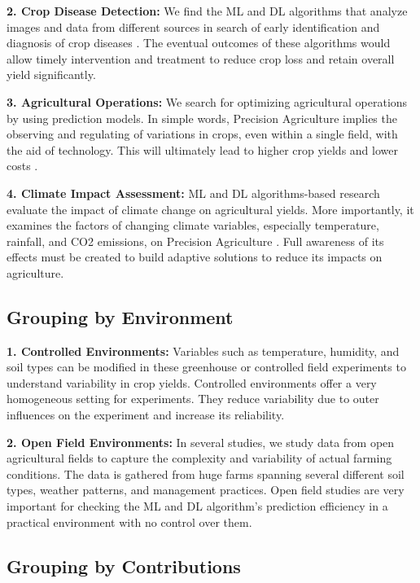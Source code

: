 \documentclass[conference]{IEEEtran}
\begin{document}
\textbf{2. Crop Disease Detection:}
We find the ML and DL algorithms that analyze images and data from different sources in search of early identification and diagnosis of crop diseases \cite{b71}. The eventual outcomes of these algorithms would allow timely intervention and treatment to reduce crop loss and retain overall yield significantly.

\textbf{3. Agricultural Operations:}
We search for optimizing agricultural operations by using prediction models. In simple words, Precision Agriculture implies the observing and regulating of variations in crops, even within a single field, with the aid of technology. This will ultimately lead to higher crop yields and lower costs \cite{b72}.

\textbf{4. Climate Impact Assessment:}
ML and DL algorithms-based research evaluate the impact of climate change on agricultural yields. More importantly, it examines the factors of changing climate variables, especially temperature, rainfall, and CO2 emissions, on Precision Agriculture \cite{b73}. Full awareness of its effects must be created to build adaptive solutions to reduce its impacts on agriculture.

\subsection{Grouping by Environment}

\textbf{1. Controlled Environments:}
Variables such as temperature, humidity, and soil types can be modified in these greenhouse or controlled field experiments to understand variability in crop yields. Controlled environments offer a very homogeneous setting for experiments. They reduce variability due to outer influences on the experiment and increase its reliability.

\textbf{2. Open Field Environments:}
In several studies, we study data from open agricultural fields to capture the complexity and variability of actual farming conditions. The data is gathered from huge farms spanning several different soil types, weather patterns, and management practices. Open field studies are very important for checking the ML and DL algorithm's prediction efficiency in a practical environment with no control over them.

\subsection{Grouping by Contributions}
\end{document}
